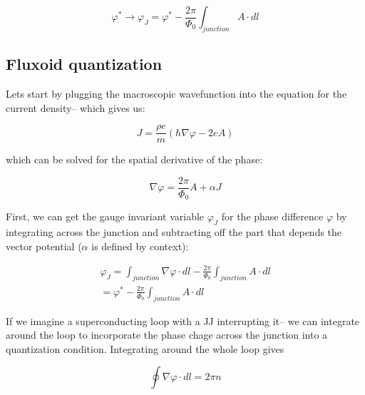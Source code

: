 \documentclass[paper=a4, twocolumn, fontsize=10pt]{article} %
\numberwithin{equation}{section} %
\numberwithin{figure}{section} %
\numberwithin{table}{section} %
\begin{document}
\[ \varphi^* \to \varphi_J = \varphi^* -  \frac{2\pi}{\Phi_0} \int_{junction} A \cdot dl \]


\subsection{Fluxoid quantization}

Lets start by plugging the macroscopic wavefunction into the equation for the current density-- which gives us:

\[ J = \frac{\rho e}{m} \left(\hbar\nabla \varphi - 2e A \right) \]

which can be solved for the spatial derivative of the phase:

\[ \nabla \varphi = \frac{2\pi}{\Phi_0}  A + \alpha J  \]


First, we can get the gauge invariant variable $\varphi_J$ for the phase difference $\varphi$ by integrating across the junction and subtracting off the part that depends the vector potential ($\alpha$ is defined by context):

\begin{align}
    \varphi_J = \int_{junction} \nabla \varphi \cdot dl -  \frac{2\pi}{\Phi_0} \int_{junction} A \cdot dl
    \\
    = \varphi^* -  \frac{2\pi}{\Phi_0} \int_{junction} A \cdot dl
\end{align}

If we imagine a superconducting loop with a JJ interrupting it-- we can integrate around the loop to incorporate the phase chage across the junction into a quantization condition. Integrating around the whole loop gives

\[ \oint \nabla \varphi \cdot dl = 2\pi n\]
\end{document}

